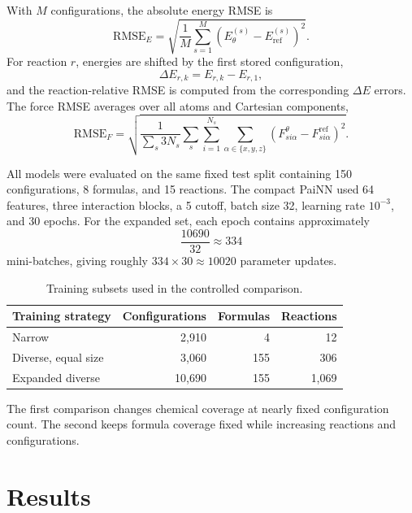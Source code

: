 \documentclass[11pt,a4paper]{article}
\begin{document}
With $M$ configurations, the absolute energy RMSE is
\begin{equation}
  \mathrm{RMSE}_E =
  \sqrt{\frac{1}{M}\sum_{s=1}^{M}
  \left(E_{\theta}^{(s)}-E_{\mathrm{ref}}^{(s)}\right)^2}.
\end{equation}
For reaction $r$, energies are shifted by the first stored configuration,
\begin{equation}
  \Delta E_{r,k}=E_{r,k}-E_{r,1},
\end{equation}
and the reaction-relative RMSE is computed from the corresponding $\Delta E$ errors.
The force RMSE averages over all atoms and Cartesian components,
\begin{equation}
  \mathrm{RMSE}_F =
  \sqrt{\frac{1}{\sum_s 3N_s}
  \sum_s\sum_{i=1}^{N_s}\sum_{\alpha\in\{x,y,z\}}
  \left(F_{si\alpha}^{\theta}-F_{si\alpha}^{\mathrm{ref}}\right)^2}.
\end{equation}

All models were evaluated on the same fixed test split containing 150 configurations,
8 formulas, and 15 reactions. The compact PaiNN used 64 features, three interaction
blocks, a \SI{5}{\angstromunit} cutoff, batch size 32, learning rate $10^{-3}$, and
30 epochs. For the expanded set, each epoch contains approximately
\begin{equation}
  \frac{10690}{32}\approx 334
\end{equation}
mini-batches, giving roughly $334\times30\approx10020$ parameter updates.

\begin{table}[H]
  \centering
  \caption{Training subsets used in the controlled comparison.}
  \label{tab:datasets}
  \begin{tabular}{lrrr}
    \toprule
    Training strategy & Configurations & Formulas & Reactions \\
    \midrule
    Narrow & 2,910 & 4 & 12 \\
    Diverse, equal size & 3,060 & 155 & 306 \\
    Expanded diverse & 10,690 & 155 & 1,069 \\
    \bottomrule
  \end{tabular}
\end{table}

The first comparison changes chemical coverage at nearly fixed configuration count.
The second keeps formula coverage fixed while increasing reactions and configurations.

\section{Results}
\end{document}
